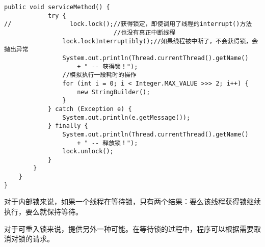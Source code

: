 \documentclass[a4paper]{report}
\begin{document}
\begin{Verbatim}[frame=single,numbersep=5pt,xleftmargin=1.5em,xrightmargin=1.5em]
        public void serviceMethod() {
            try {
//                lock.lock();//获得锁定，即使调用了线程的interrupt()方法
                              //也没有真正中断线程
                lock.lockInterruptibly();//如果线程被中断了，不会获得锁，会抛出异常
                System.out.println(Thread.currentThread().getName()
                    + " -- 获得锁！");
                //模拟执行一段耗时的操作
                for (int i = 0; i < Integer.MAX_VALUE >>> 2; i++) {
                    new StringBuilder();
                }
            } catch (Exception e) {
                System.out.println(e.getMessage());
            } finally {
                System.out.println(Thread.currentThread().getName()
                    + " -- 释放锁！");
                lock.unlock();
            }
        }
    }
}
\end{Verbatim}

对于内部锁来说，如果一个线程在等待锁，只有两个结果：要么该线程获得锁继续执行，要么就保持等待。

对于可重入锁来说，提供另外一种可能。在等待锁的过程中，程序可以根据需要取消对锁的请求。
\end{document}
